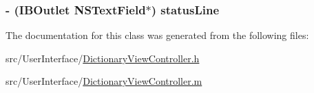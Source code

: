 \hypertarget{interface_dictionary_view_controller_aacfe6b58ab19b07b9d9c68dcc1f6ddd9}{
\subsubsection[{status\-Line}]{\setlength{\rightskip}{0pt plus 5cm}-\/ (I\-B\-Outlet N\-S\-Text\-Field$\ast$) status\-Line\hspace{0.3cm}{\ttfamily [protected]}}}\label{interface_dictionary_view_controller_aacfe6b58ab19b07b9d9c68dcc1f6ddd9}


The documentation for this class was generated from the following files\-:\begin{DoxyCompactItemize}
\item 
src/\-User\-Interface/\hyperlink{_dictionary_view_controller_8h}{Dictionary\-View\-Controller.\-h}\item 
src/\-User\-Interface/\hyperlink{_dictionary_view_controller_8m}{Dictionary\-View\-Controller.\-m}\end{DoxyCompactItemize}
